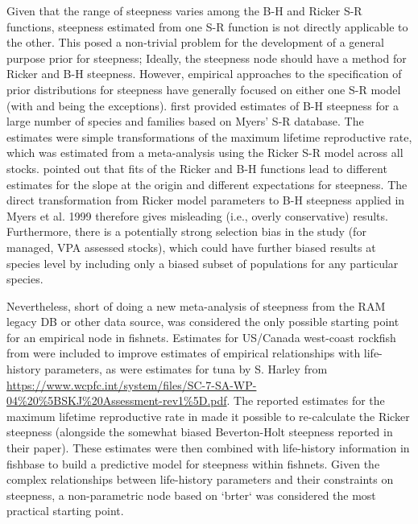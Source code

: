 \documentclass{dragonfly-report}\usepackage[]{graphicx}\usepackage[]{color}
\begin{document}
Given that the range of steepness varies among the B-H and Ricker S-R functions, steepness estimated from one S-R function is not directly applicable to the other. This posed a non-trivial problem for the development of a general purpose prior for steepness; Ideally, the steepness node should have a method for Ricker and B-H steepness. However, empirical approaches to the specification of prior distributions for steepness have generally focused on either one S-R model (with \citet{michielsens_2004_bayesian} and \citet{forrest2010hierarchical} being the exceptions). \citet{myers_1999_maximum} first provided estimates of B-H steepness for a large number of species and families based on Myers' S-R database. The estimates were simple transformations of the maximum lifetime reproductive rate, which was estimated from a meta-analysis using the Ricker S-R model across all stocks. \citet{michielsens_2004_bayesian} pointed out that fits of the Ricker and B-H functions lead to different estimates for the slope at the origin and different expectations for steepness. The direct transformation from Ricker model parameters to B-H steepness applied in Myers et al. 1999 therefore gives misleading (i.e., overly conservative) results. Furthermore, there is a potentially strong selection bias in the study (for managed, VPA assessed stocks), which could have further biased results at species level by including only a biased subset of populations for any particular species.

Nevertheless, short of doing a new meta-analysis of steepness from the RAM legacy DB or other data source, \citet{myers_1999_maximum} was considered the only possible starting point for an empirical node in fishnets. Estimates for US/Canada west-coast rockfish from \citet{forrest2010hierarchical} were included to improve estimates of empirical relationships with life-history parameters, as were estimates for tuna by S. Harley from \url{https://www.wcpfc.int/system/files/SC-7-SA-WP-04\%20\%5BSKJ\%20Assessment-rev1\%5D.pdf}. The reported estimates for the maximum lifetime reproductive rate in \citet{myers_1999_maximum} made it possible to re-calculate the Ricker steepness (alongside the somewhat biased Beverton-Holt steepness reported in their paper). These estimates were then combined with life-history information in fishbase to build a predictive model for steepness within fishnets. Given the complex relationships between life-history parameters and their constraints on steepness, a non-parametric node based on `brter` was considered the most practical starting point.
\end{document}
